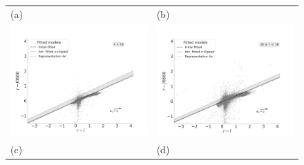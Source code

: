 \documentclass[fleqn,usenatbib]{mnras}
\begin{document}
\begin{figure}
  \setlength\tabcolsep{0pt}
  \begin{tabular}{ll}
    (a) & (b) \\
    \includegraphics[trim=10 0 65 20, clip]{Figs/diagram-DR3-errorFlag0-3f-16r}
    & \includegraphics[trim=10 0 65 20, clip]{Figs/diagram-DR3-errorFlag0-3f-16r18}\\
    (c) & (d) \\

\end{tabular}
\end{figure}
\end{document}
